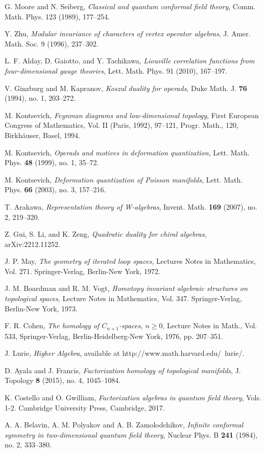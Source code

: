 \begin{thebibliography}{99}
 G. Moore and N. Seiberg, \emph{Classical and quantum conformal field theory}, 
  Comm. Math. Phys. 123 (1989), 177--254.

 Y. Zhu, \emph{Modular invariance of characters of vertex operator algebras}, 
  J. Amer. Math. Soc. 9 (1996), 237--302.

 L. F. Alday, D. Gaiotto, and Y. Tachikawa, \emph{Liouville correlation functions from four-dimensional gauge theories}, 
  Lett. Math. Phys. 91 (2010), 167--197.

 V. Ginzburg and M. Kapranov, \emph{Koszul duality for operads}, Duke Math. J. \textbf{76} (1994), no. 1, 203--272.

 M. Kontsevich, \emph{Feynman diagrams and low-dimensional topology}, First European Congress of Mathematics, Vol. II (Paris, 1992), 97--121, Progr. Math., 120, Birkhäuser, Basel, 1994.

 M. Kontsevich, \emph{Operads and motives in deformation quantization}, Lett. Math. Phys. \textbf{48} (1999), no. 1, 35--72.

 M. Kontsevich, \emph{Deformation quantization of Poisson manifolds}, Lett. Math. Phys. \textbf{66} (2003), no. 3, 157--216.

 T. Arakawa, \emph{Representation theory of W-algebras}, Invent. Math. \textbf{169} (2007), no. 2, 219--320.

 Z. Gui, S. Li, and K. Zeng, \emph{Quadratic duality for chiral algebras}, arXiv:2212.11252.

 J. P. May, \emph{The geometry of iterated loop spaces}, Lectures Notes in Mathematics, Vol. 271. Springer-Verlag, Berlin-New York, 1972.

 J. M. Boardman and R. M. Vogt, \emph{Homotopy invariant algebraic structures on topological spaces}, Lecture Notes in Mathematics, Vol. 347. Springer-Verlag, Berlin-New York, 1973.

 F. R. Cohen, \emph{The homology of $C_{n+1}$-spaces, $n \geq 0$}, Lecture Notes in Math., Vol. 533, Springer-Verlag, Berlin-Heidelberg-New York, 1976, pp. 207--351.

 J. Lurie, \emph{Higher Algebra}, available at http://www.math.harvard.edu/~lurie/.

 D. Ayala and J. Francis, \emph{Factorization homology of topological manifolds}, J. Topology \textbf{8} (2015), no. 4, 1045--1084.

 K. Costello and O. Gwilliam, \emph{Factorization algebras in quantum field theory}, Vols. 1-2. Cambridge University Press, Cambridge, 2017.

 A. A. Belavin, A. M. Polyakov and A. B. Zamolodchikov, \emph{Infinite conformal symmetry in two-dimensional quantum field theory}, Nuclear Phys. B \textbf{241} (1984), no. 2, 333--380.
 
\end{thebibliography}